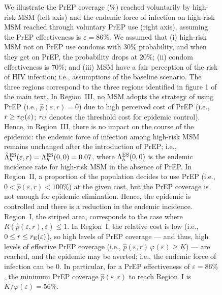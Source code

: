 \documentclass[11pt]{article}
\begin{document}
\begin{figure}[H]
{We illustrate the PrEP coverage ($\%$) reached voluntarily by high-risk MSM (left axis) and the endemic force of infection on high-risk MSM reached through voluntary PrEP use (right axis), assuming the PrEP effectiveness is $\varepsilon=86\%$. We assumed that (i) high-risk MSM not on PrEP use condoms with $30\%$ probability, and when they get on PrEP, the probability drops at $20\%$; (ii) condom effectiveness is $70\%$; and (iii) MSM have a fair perception of the risk of HIV infection; i.e., assumptions of the baseline scenario. The three regions correspond to the three regions identified in figure 1 of the main text. In Region~III, no MSM adopts the strategy of using PrEP (i.e., $\hat{p}(\varepsilon,r)=0$) due to high perceived cost of PrEP (i.e., $r \geq r_{\rm C}(\varepsilon)$; $r_{\rm C}$ denotes the threshold cost for epidemic control). Hence, in Region~III, there is no impact on the course of the epidemic: the endemic force of infection among high-risk MSM remains unchanged after the introduction of PrEP; i.e., $\hat{\Lambda}_h^{\rm ES}(\varepsilon, r) = \Lambda_h^{\rm ES}(0,0) = 0.07$, where $\Lambda_h^{\rm ES}(0,0)$ is the endemic incidence rate for high-risk MSM in the absence of PrEP. In Region~II,  a proportion of the population decides to use PrEP (i.e., $0<\hat{p}(\varepsilon,r) <100\%$) at the given cost, but the PrEP coverage is not enough for epidemic elimination. Hence, the epidemic is controlled and there is a reduction in the endemic incidence. Region~I, the striped area, corresponds to the case where $R\left(\hat{p}(\varepsilon,r),\varepsilon\right) \leq 1$. In Region~I, the relative cost is low (i.e., $0 \leq r \leq r_{\rm E} (\varepsilon)$), so high levels of PrEP coverage --- and thus, high levels of effective PrEP coverage (i.e., $\hat{p}(\varepsilon,r) \,\varphi(\varepsilon) \geq K$) --- are reached, and the epidemic may be averted; i.e., the endemic force of infection can be 0. In particular, for a PrEP effectiveness of $\varepsilon=86\%$, the minimum PrEP coverage $\hat{p}(\varepsilon,r)$ to reach Region~I is $K/\varphi(\varepsilon) = 56\%$.}	\label{fig:p_hat}
\end{figure}
\end{document}
